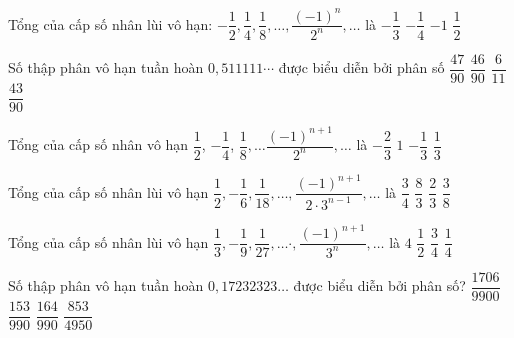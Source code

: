\begin{ex}%
	Tổng của cấp số nhân lùi vô hạn: $-\dfrac{1}{2},\dfrac{1}{4},\dfrac{1}{8},\ldots,\dfrac{(-1)^n}{2^n},\ldots$ là 
	\choice
	{\True $-\dfrac{1}{3}$}
	{$-\dfrac{1}{4}$}
	{$-1$}
	{$\dfrac{1}{2}$}
\end{ex}
\begin{ex}%
	Số thập phân vô hạn tuần hoàn $0{,}511111\cdots$ được biểu diễn bởi phân số
	\choice
	{$\dfrac{47}{90}$}
	{\True $\dfrac{46}{90}$}
	{$\dfrac{6}{11}$}
	{$\dfrac{43}{90}$}
\end{ex}
\begin{ex}%
	Tổng của cấp số nhân vô hạn $\dfrac{1}{2}$, $-\dfrac{1}{4}$, $\dfrac{1}{8},\ldots\dfrac{(-1)^{n+1}}{2^n},\ldots$ là
	\choice
	{$-\dfrac{2}{3}$}
	{$1$}
	{$-\dfrac{1}{3}$}
	{\True $\dfrac{1}{3}$}
\end{ex}
\begin{ex}%
	Tổng của cấp số nhân lùi vô hạn $\dfrac{1}{2},-\dfrac{1}{6},\dfrac{1}{18},\ldots,\dfrac{(-1)^{n+1}}{2\cdot 3^{n-1}},\ldots$ là
	\choice
	{$\dfrac{3}{4}$}
	{$\dfrac{8}{3}$}
	{$\dfrac{2}{3}$}
	{\True $\dfrac{3}{8}$}
\end{ex}
\begin{ex}%
	Tổng của cấp số nhân lùi vô hạn $\dfrac{1}{3},-\dfrac{1}{9},\dfrac{1}{27},\ldots\cdot,\dfrac{(-1)^{n+1}}{3^n},\ldots$ là
	\choice
	{$4$}
	{$\dfrac{1}{2}$}
	{$\dfrac{3}{4}$}
	{\True $\dfrac{1}{4}$}
\end{ex}
\begin{ex}%
	Số thập phân vô hạn tuần hoàn $0{,}17232323\ldots$ được biểu diễn bởi phân số?
	\choice
	{$\dfrac{1706}{9900}$}
	{$\dfrac{153}{990}$}
	{$\dfrac{164}{990}$}
	{\True $\dfrac{853}{4950}$}
\end{ex}

